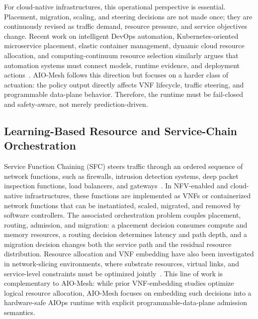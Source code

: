 \documentclass[final,5p]{elsarticle}
\begin{document}
For cloud-native infrastructures, this operational perspective is essential. Placement, migration, scaling, and steering decisions are not made once; they are continuously revised as traffic demand, resource pressure, and service objectives change. Recent work on intelligent DevOps automation, Kubernetes-oriented microservice placement, elastic container management, dynamic cloud resource allocation, and computing-continuum resource selection similarly argues that automation systems must connect models, runtime evidence, and deployment actions~\cite{eramo2024architecture,ding2023kubernetes,mao2023flowcon,chen2023workloadwindows,hortelano2023drlresource,chen2024crossedge,sedghani2024space4aid}. AIO-Mesh follows this direction but focuses on a harder class of actuation: the policy output directly affects VNF lifecycle, traffic steering, and programmable data-plane behavior. Therefore, the runtime must be fail-closed and safety-aware, not merely prediction-driven.

\subsection{Learning-Based Resource and Service-Chain Orchestration}
\label{subsec:related_learning}

Service Function Chaining (SFC) steers traffic through an ordered sequence of network functions, such as firewalls, intrusion detection systems, deep packet inspection functions, load balancers, and gateways~\cite{rfc7665}. In NFV-enabled and cloud-native infrastructures, these functions are implemented as VNFs or containerized network functions that can be instantiated, scaled, migrated, and removed by software controllers. The associated orchestration problem couples placement, routing, admission, and migration: a placement decision consumes compute and memory resources, a routing decision determines latency and path depth, and a migration decision changes both the service path and the residual resource distribution. Resource allocation and VNF embedding have also been investigated in network-slicing environments, where substrate resources, virtual links, and service-level constraints must be optimized jointly~\cite{jOptimizeSlice24}. This line of work is complementary to AIO-Mesh: while prior VNF-embedding studies optimize logical resource allocation, AIO-Mesh focuses on embedding such decisions into a hardware-safe AIOps runtime with explicit programmable-data-plane admission semantics.
\end{document}
